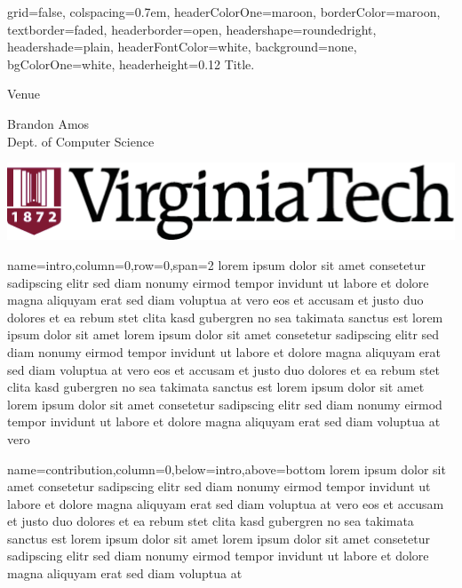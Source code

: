 \documentclass[landscape,specialSize,fontscale=0.3]{baposter}
\begin{document}
\begin{poster}{
    grid=false, %
    colspacing=0.7em, %
    headerColorOne=maroon, borderColor=maroon, %
    textborder=faded, %
    headerborder=open, headershape=roundedright,
    headershade=plain, headerFontColor=white,
    background=none, bgColorOne=white,
    headerheight=0.12\textheight
  }{
  }{
    \sc\Huge Title.
  }{
    \bigskip\Large
    \begin{minipage}{0.4\textwidth}
      Venue
    \end{minipage}
    \begin{minipage}{0.4\textwidth}
      Brandon Amos \\
      Dept. of Computer Science
    \end{minipage}
  }{
    \includegraphics[height=0.05\textheight]{vtlogo-new}
  }

  {name=intro,column=0,row=0,span=2}{
    lorem ipsum dolor sit amet consetetur sadipscing elitr sed diam nonumy
    eirmod tempor invidunt ut labore et dolore magna aliquyam erat sed diam
    voluptua at vero eos et accusam et justo duo dolores et ea rebum stet clita
    kasd gubergren no sea takimata sanctus est lorem ipsum dolor sit amet lorem
    ipsum dolor sit amet consetetur sadipscing elitr sed diam nonumy eirmod
    tempor invidunt ut labore et dolore\cite{article}
    magna aliquyam erat sed diam voluptua at
    vero eos et accusam et justo duo dolores et ea rebum stet clita kasd
    gubergren no sea takimata sanctus est lorem ipsum dolor sit amet lorem ipsum
    dolor sit amet consetetur sadipscing elitr sed diam nonumy eirmod tempor
    invidunt ut labore et dolore magna aliquyam erat sed diam voluptua at vero
  }

  {name=contribution,column=0,below=intro,above=bottom}{
    lorem ipsum dolor sit amet consetetur sadipscing elitr sed diam nonumy
    eirmod tempor invidunt ut labore et dolore magna aliquyam erat sed diam
    voluptua at vero eos et accusam et justo duo dolores et ea rebum stet clita
    kasd gubergren no sea takimata sanctus est lorem ipsum dolor sit amet lorem
    ipsum dolor sit amet consetetur sadipscing elitr sed diam nonumy eirmod
    tempor invidunt ut labore et dolore\cite{article}
    magna aliquyam erat sed diam voluptua at
  }


\end{poster}
\end{document}
